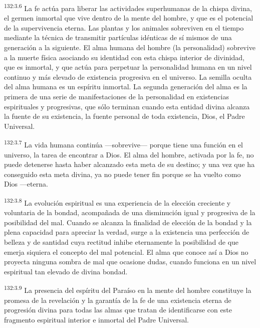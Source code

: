 \par
\textsuperscript{132:3.6} La fe actúa para liberar las actividades superhumanas de la chispa divina, el germen inmortal que vive dentro de la mente del hombre, y que es el potencial de la supervivencia eterna. Las plantas y los animales sobreviven en el tiempo mediante la técnica de transmitir partículas idénticas de sí mismos de una generación a la siguiente. El alma humana del hombre (la personalidad) sobrevive a la muerte física asociando su identidad con esta chispa interior de divinidad, que es inmortal, y que actúa para perpetuar la personalidad humana en un nivel continuo y más elevado de existencia progresiva en el universo. La semilla oculta del alma humana es un espíritu inmortal. La segunda generación del alma es la primera de una serie de manifestaciones de la personalidad en existencias espirituales y progresivas, que sólo terminan cuando esta entidad divina alcanza la fuente de su existencia, la fuente personal de toda existencia, Dios, el Padre Universal.

\par
\textsuperscript{132:3.7} La vida humana continúa ---sobrevive--- porque tiene una función en el universo, la tarea de encontrar a Dios. El alma del hombre, activada por la fe, no puede detenerse hasta haber alcanzado esta meta de su destino; y una vez que ha conseguido esta meta divina, ya no puede tener fin porque se ha vuelto como Dios ---eterna.

\par
\textsuperscript{132:3.8} La evolución espiritual es una experiencia de la elección creciente y voluntaria de la bondad, acompañada de una disminución igual y progresiva de la posibilidad del mal. Cuando se alcanza la finalidad de elección de la bondad y la plena capacidad para apreciar la verdad, surge a la existencia una perfección de belleza y de santidad cuya rectitud inhibe eternamente la posibilidad de que emerja siquiera el concepto del mal potencial. El alma que conoce así a Dios no proyecta ninguna sombra de mal que ocasione dudas, cuando funciona en un nivel espiritual tan elevado de divina bondad.

\par
\textsuperscript{132:3.9} La presencia del espíritu del Paraíso en la mente del hombre constituye la promesa de la revelación y la garantía de la fe de una existencia eterna de progresión divina para todas las almas que tratan de identificarse con este fragmento espiritual interior e inmortal del Padre Universal.

